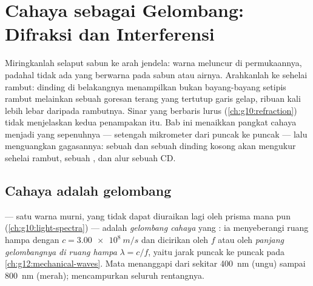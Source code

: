 \chapter{Cahaya sebagai Gelombang: Difraksi dan Interferensi}\label{ch:g12:light-as-wave}

Miringkanlah selaput sabun ke arah jendela: warna meluncur di
permukaannya, padahal tidak ada yang berwarna pada sabun atau airnya.
Arahkanlah  ke sehelai rambut: dinding di belakangnya menampilkan
bukan bayang-bayang setipis rambut melainkan sebuah goresan terang yang
tertutup garis gelap, ribuan kali lebih lebar daripada rambutnya. Sinar
yang berbaris lurus (\cref{ch:g10:refraction}) tidak menjelaskan kedua
penampakan itu. Bab ini menaikkan pangkat cahaya menjadi  yang
sepenuhnya --- setengah mikrometer dari puncak ke puncak --- lalu
menguangkan gagasannya: sebuah  dan sebuah dinding kosong akan
mengukur sehelai rambut, sebuah , dan alur sebuah CD.

\section{Cahaya adalah gelombang}

\begin{definition}\label{def:g12:light-as-wave:lightwave}
 --- satu warna murni, yang tidak dapat diuraikan
lagi oleh prisma mana pun (\cref{ch:g10:light-spectra}) --- adalah
\emph{gelombang cahaya} yang : ia
menyeberangi ruang hampa dengan $c = \qty{3.00e8}{m/s}$ dan dicirikan
oleh  $f$ atau oleh \emph{panjang gelombangnya di ruang
hampa} $\lambda = c/f$, yaitu jarak
puncak ke puncak pada \cref{ch:g12:mechanical-waves}. Mata menanggapi
dari sekitar \qty{400}{nm} (ungu) sampai \qty{800}{nm} (merah);  mencampurkan seluruh rentangnya.
\end{definition}

